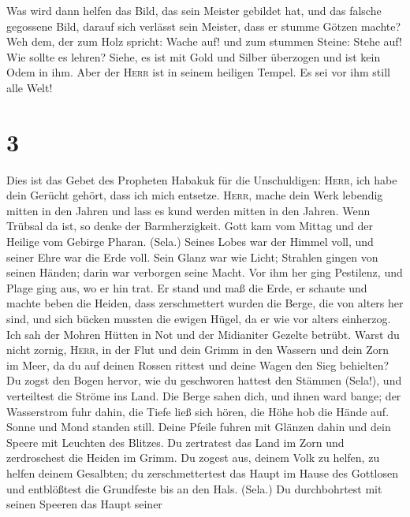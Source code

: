  Was wird dann helfen das Bild, das sein Meister gebildet
hat, und das falsche gegossene Bild, darauf sich verlässt sein Meister,
dass er stumme Götzen machte?  Weh dem, der zum Holz
spricht: Wache auf! und zum stummen Steine: Stehe auf! Wie sollte es
lehren? Siehe, es ist mit Gold und Silber überzogen und ist kein Odem in
ihm.  Aber der \textsc{Herr} ist in seinem heiligen
Tempel. Es sei vor ihm still alle Welt!

\hypertarget{section-2}{%
\section{3}\label{section-2}}

 Dies ist das Gebet des Propheten Habakuk für die
Unschuldigen:  \textsc{Herr}, ich habe dein Gerücht
gehört, dass ich mich entsetze. \textsc{Herr}, mache dein Werk lebendig
mitten in den Jahren und lass es kund werden mitten in den Jahren. Wenn
Trübsal da ist, so denke der Barmherzigkeit.  Gott kam vom
Mittag und der Heilige vom Gebirge Pharan. (Sela.) Seines Lobes war der
Himmel voll, und seiner Ehre war die Erde voll.  Sein
Glanz war wie Licht; Strahlen gingen von seinen Händen; darin war
verborgen seine Macht.  Vor ihm her ging Pestilenz, und
Plage ging aus, wo er hin trat.  Er stand und maß die
Erde, er schaute und machte beben die Heiden, dass zerschmettert wurden
die Berge, die von alters her sind, und sich bücken mussten die ewigen
Hügel, da er wie vor alters einherzog.  Ich sah der Mohren
Hütten in Not und der Midianiter Gezelte betrübt.  Warst
du nicht zornig, \textsc{Herr}, in der Flut und dein Grimm in den
Wassern und dein Zorn im Meer, da du auf deinen Rossen rittest und deine
Wagen den Sieg behielten?  Du zogst den Bogen hervor, wie
du geschworen hattest den Stämmen (Sela!), und verteiltest die Ströme
ins Land.  Die Berge sahen dich, und ihnen ward bange;
der Wasserstrom fuhr dahin, die Tiefe ließ sich hören, die Höhe hob die
Hände auf.  Sonne und Mond standen still. Deine Pfeile
fuhren mit Glänzen dahin und dein Speere mit Leuchten des Blitzes.
 Du zertratest das Land im Zorn und zerdroschest die
Heiden im Grimm.  Du zogest aus, deinem Volk zu helfen,
zu helfen deinem Gesalbten; du zerschmettertest das Haupt im Hause des
Gottlosen und entblößtest die Grundfeste bis an den Hals. (Sela.)
 Du durchbohrtest mit seinen Speeren das Haupt seiner
